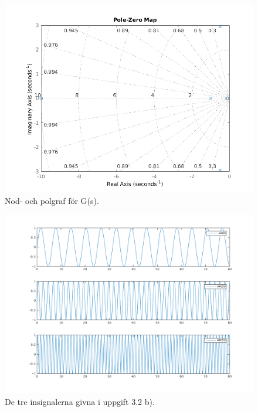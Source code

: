\begin{figure}
    \label{fig:task2a-pzmap}
    \caption{Nod- och polgraf för G(s).}
    \centering
    \includegraphics[scale=0.8]{figures/task2a-pzmap.png}
\end{figure}

\begin{figure}
    \label{fig:task2b}
    \caption{De tre insignalerna givna i uppgift 3.2 b).}
    \centering
    \includegraphics[scale=0.55]{figures/task2b.png}
\end{figure}

